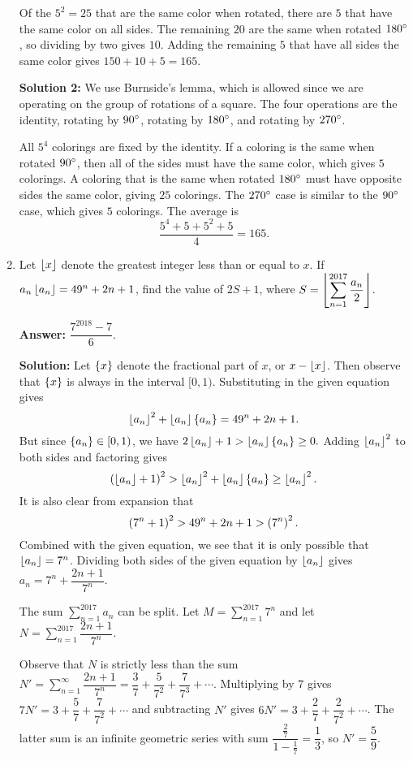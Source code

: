 \documentclass[11pt,paper=letter]{scrartcl}
\begin{document}
\begin{enumerate}[left=0pt]
Of the $5^2 = 25$ that are the same color when rotated, there are $5$ that have the same color on all sides. The remaining $20$ are the same when rotated $180^\circ$, so dividing by two gives $10$. Adding the remaining $5$ that have all sides the same color gives $150 + 10 + 5 = 165$.

\textbf{Solution 2:} We use Burnside's lemma, which is allowed since we are operating on the group of rotations of a square. The four operations are the identity, rotating by $90^\circ$, rotating by $180^\circ$, and rotating by $270^\circ$.

All $5^4$ colorings are fixed by the identity. If a coloring is the same when rotated $90^\circ$, then all of the sides must have the same color, which gives $5$ colorings. A coloring that is the same when rotated $180^\circ$ must have opposite sides the same color, giving $25$ colorings. The $270^\circ$ case is similar to the $90^\circ$ case, which gives $5$ colorings. The average is $$\frac{5^4 + 5 + 5^2 + 5}4 = 165.$$

\item Let $\left\lfloor x \right\rfloor$ denote the greatest integer less than or equal to $x$. If $a_n\left\lfloor a_n \right\rfloor = 49^n + 2n + 1$, find the value of $2S + 1$, where $S = \displaystyle \left\lfloor \sum_{n=1}^{2017}\frac{a_n}2 \right\rfloor$.

\textbf{Answer:} $\boxed{\dfrac{7^{2018}-7}6}$.

\textbf{Solution:} Let $\left\{ x \right\}$ denote the fractional part of $x$, or $x - \left\lfloor x \right\rfloor$. Then observe that $\left\{ x \right\}$ is always in the interval $[0, 1)$. Substituting in the given equation gives $$\left\lfloor a_n \right\rfloor^2 + \left\lfloor a_n \right\rfloor\left\{ a_n \right\} = 49^n + 2n + 1.$$ But since $\left\{ a_n \right\} \in [0, 1)$, we have $2\left\lfloor a_n \right\rfloor + 1 > \left\lfloor a_n \right\rfloor\left\{ a_n \right\} \geq 0.$ Adding $\left\lfloor a_n \right\rfloor^2$ to both sides and factoring gives $$\left( \left\lfloor a_n \right\rfloor + 1 \right)^2 > \left\lfloor a_n \right\rfloor^2 + \left\lfloor a_n \right\rfloor\left\{ a_n \right\} \geq \left\lfloor a_n \right\rfloor^2.$$ It is also clear from expansion that $$\left( 7^n + 1 \right)^2 > 49^n + 2n + 1 > \left( 7^n \right)^2.$$ Combined with the given equation, we see that it is only possible that $\left\lfloor a_n \right\rfloor = 7^n$. Dividing both sides of the given equation by $\left\lfloor a_n \right\rfloor$ gives $a_n = 7^n + \dfrac{2n+1}{7^n}$.

The sum $\displaystyle \sum_{n=1}^{2017} a_n$ can be split. Let $M = \displaystyle\sum_{n=1}^{2017} 7^n$ and let $N = \displaystyle \sum_{n=1}^{2017} \dfrac{2n+1}{7^n}$. 

Observe that $N$ is strictly less than the sum $N' = \displaystyle \sum_{n=1}^{\infty} \dfrac{2n+1}{7^n} = \dfrac37 + \dfrac5{7^2} + \dfrac7{7^3} + \cdots$. Multiplying by $7$ gives $7N' = 3 + \dfrac57 + \dfrac7{7^2} + \cdots$ and subtracting $N'$ gives $6N' = 3 + \dfrac27 + \dfrac2{7^2} + \cdots$. The latter sum is an infinite geometric series with sum $\dfrac{\frac27}{1 - \frac17} = \dfrac13$, so $N' = \dfrac59$.


\end{enumerate}
\end{document}
